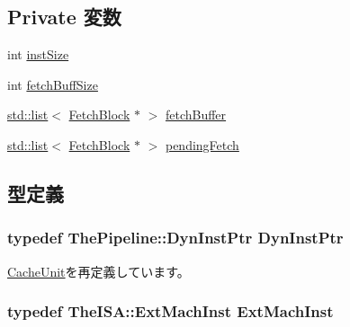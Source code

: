 \subsection*{Private 変数}
\begin{DoxyCompactItemize}
\item 
int \hyperlink{classFetchUnit_a494a9a986bc62c946604f9e9047ad237}{instSize}
\item 
int \hyperlink{classFetchUnit_a97e2b6a8af0f5cb34f9d266a9ac21a48}{fetchBuffSize}
\item 
\hyperlink{classstd_1_1list}{std::list}$<$ \hyperlink{structFetchUnit_1_1FetchBlock}{FetchBlock} $\ast$ $>$ \hyperlink{classFetchUnit_ab201075a98e275240766bee54144d42d}{fetchBuffer}
\item 
\hyperlink{classstd_1_1list}{std::list}$<$ \hyperlink{structFetchUnit_1_1FetchBlock}{FetchBlock} $\ast$ $>$ \hyperlink{classFetchUnit_af2a77ef8e6fe01c93bcac28b1152e44b}{pendingFetch}
\end{DoxyCompactItemize}


\subsection{型定義}
\hypertarget{classFetchUnit_af9d0c8a46736ba6aa2d8bb94da1a5e73}{
\subsubsection[{DynInstPtr}]{\setlength{\rightskip}{0pt plus 5cm}typedef {\bf ThePipeline::DynInstPtr} {\bf DynInstPtr}}}
\label{classFetchUnit_af9d0c8a46736ba6aa2d8bb94da1a5e73}


\hyperlink{classCacheUnit_af9d0c8a46736ba6aa2d8bb94da1a5e73}{CacheUnit}を再定義しています。\hypertarget{classFetchUnit_a5605d4fc727eae9e595325c90c0ec108}{
\subsubsection[{ExtMachInst}]{\setlength{\rightskip}{0pt plus 5cm}typedef TheISA::ExtMachInst {\bf ExtMachInst}}}
\label{classFetchUnit_a5605d4fc727eae9e595325c90c0ec108}


